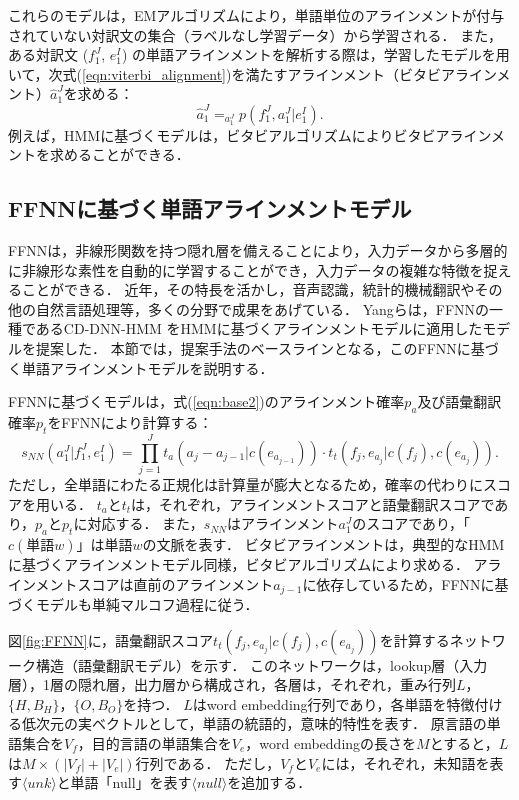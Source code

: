 \documentclass[japanese]{jnlp_1.4}
\newcommand{\argmax}{}
\begin{document}
これらのモデルは，EMアルゴリズム\cite{dempster77}により，単語単位のアラインメントが付与されていない対訳文の集合（ラベルなし学習データ）から学習される．
また，ある対訳文 ($f_{1}^{J}$, $e_{1}^{I}$) の単語アラインメントを解析する際は，学習したモデルを用いて，次式(\ref{eqn:viterbi_alignment})を満たすアラインメント（ビタビアラインメント）$\hat{a}_{1}^{J}$を求める：
\begin{equation}
\label{eqn:viterbi_alignment}
\hat{a}_{1}^{J}=\argmax_{a_{1}^{J}} p(f_{1}^{J},a_{1}^{J}|e_{1}^{I}).
\end{equation}
例えば，HMMに基づくモデルは，ビタビアルゴリズム\cite{viterbi67}によりビタビアラインメントを求めることができる．


\subsection{FFNNに基づく単語アラインメントモデル}
\label{sect:FFNN}

FFNNは，非線形関数を持つ隠れ層を備えることにより，入力データから多層的に非線形な素性を自動的に学習することができ，入力データの複雑な特徴を捉えることができる．
近年，その特長を活かし，音声認識\cite{dahl12}，統計的機械翻訳\cite{son12,vaswani13}やその他の自然言語処理\cite{collobert08,collobert11}等，多くの分野で成果をあげている．
Yangらは，FFNNの一種であるCD-DNN-HMM \cite{dahl12}をHMMに基づくアラインメントモデルに適用したモデルを提案した\cite{yang13}．
本節では，提案手法のベースラインとなる，このFFNNに基づく単語アラインメントモデルを説明する．

FFNNに基づくモデルは，式(\ref{eqn:base2})のアラインメント確率$p_{a}$及び語彙翻訳確率$p_{t}$をFFNNにより計算する：
\begin{equation}
\label{eqn:FFNN}
s_{NN}(a_{1}^{J}|f_{1}^{J},e_{1}^{I})= \prod_{j=1}^{J}t_{a}(a_{j}-a_{j-1}|c(e_{a_{j-1}})) \cdot t_{t}(f_{j},e_{a_{j}}|c(f_{j}),c(e_{a_{j}})).
\end{equation}
ただし，全単語にわたる正規化は計算量が膨大となるため，確率の代わりにスコアを用いる．
$t_{a}$と$t_{t}$は，それぞれ，アラインメントスコアと語彙翻訳スコアであり，$p_{a}$と$p_{t}$に対応する．
また，$s_{NN}$はアラインメント$a_{1}^{J}$のスコアであり，「$c(\text{単語}w)$」は単語$w$の文脈を表す．
ビタビアラインメントは，典型的なHMMに基づくアラインメントモデル同様，ビタビアルゴリズムにより求める．
アラインメントスコアは直前のアラインメント$a_{j-1}$に依存しているため，FFNNに基づくモデルも単純マルコフ過程に従う．

図\ref{fig:FFNN}に，語彙翻訳スコア$t_{t}(f_{j},e_{a_{j}}|c(f_{j}),c(e_{a_{j}}))$を計算するネットワーク構造（語彙翻訳モデル）を示す．
このネットワークは，lookup層（入力層），1層の隠れ層，出力層から構成され，各層は，それぞれ，重み行列$L$，$\{H, B_{H}\}$，$\{O,B_{O}\}$を持つ．
$L$はword embedding行列であり，各単語を特徴付ける低次元の実ベクトルとして，単語の統語的，意味的特性を表す\cite{bengio03}．
原言語の単語集合を$V_{f}$，目的言語の単語集合を$V_{e}$，word embeddingの長さを$M$とすると，$L$は$M \times (|V_{f}|+|V_{e}|)$行列である．
ただし，$V_{f}$と$V_e$には，それぞれ，未知語を表す$\langle unk \rangle$と単語「null」を表す$\langle null \rangle$を追加する．
\end{document}
